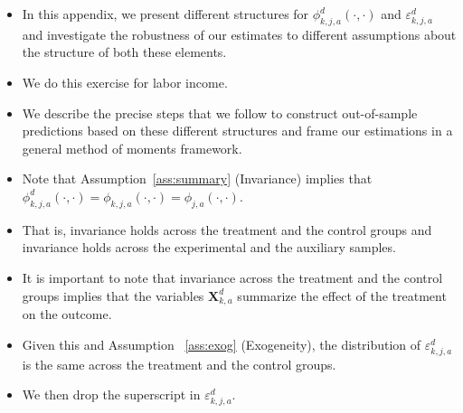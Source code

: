 \documentclass[static]{JJH-Beamer}
\begin{document}
\begin{frame}
 \addtocounter{framenumber}{-1}

\begin{itemize}
\item In this appendix, we present different structures for $\phi_{k,j,a}^d \left( \cdot, \cdot \right)$ and $\varepsilon_{k,j,a}^d$ and investigate the robustness of our estimates to different assumptions about the structure of both these elements.
\item We do this exercise for labor income.
\item We describe the precise steps that we follow to construct out-of-sample predictions based on these different structures and frame our estimations in a general method of moments framework.
\end{itemize}

\end{frame}

\begin{frame}
 \addtocounter{framenumber}{-1}

\begin{itemize}
\item Note that Assumption~\ref{ass:summary} (Invariance) implies that $\phi_{k,j,a}^d \left (\cdot, \cdot \right) = \phi_{k,j,a}  \left (\cdot, \cdot \right) = \phi_{j,a}  \left (\cdot, \cdot \right)$.
\item That is, invariance holds across the treatment and the control groups and invariance holds across the experimental and the auxiliary samples.
\item It is important to note that invariance across the treatment and the control groups implies that the variables $\bm{X}_{k,a}^d$ summarize the effect of the treatment on the outcome.
\item Given this and Assumption ~\ref{ass:exog} (Exogeneity), the distribution of $\varepsilon_{k,j,a}^d$ is the same across the treatment and the control groups.
\item We then drop the superscript in $\varepsilon_{k,j,a}^d$.
\end{itemize}

\end{frame}
\end{document}

